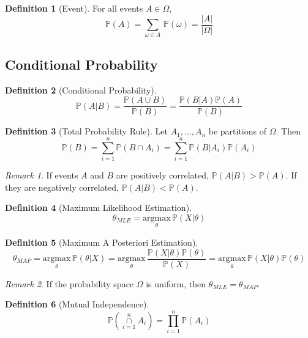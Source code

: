 \documentclass[11pt]{article}
\theoremstyle{definition}
\newtheorem{definition}{Definition}[section]
\theoremstyle{remark}
\newtheorem*{remark}{Remark}
\begin{document}
\begin{definition}[Event] For all events $A\in \Omega$,
$$\mathbb{P}(A)= \underset{\omega \in A}{\sum} \, \mathbb{P}(\omega) = \frac{|A|}{|\Omega|}$$
\end{definition}

\subsection{Conditional Probability}
\begin{definition}[Conditional Probability]
$$\mathbb{P}(A|B) = \frac{\mathbb{P}(A \cup B)}{\mathbb{P}(B)} = \frac{\mathbb{P}(B|A) \mathbb{P}(A)}{\mathbb{P}(B)}$$
\end{definition}



\begin{definition}[Total Probability Rule]
Let $A_1,\dots,A_n$ be partitions of $\Omega$. Then
\[\mathbb{P}(B)= \sum_{i=1}^n \mathbb{P}(B \cap A_i) = \sum_{i=1}^n \mathbb{P}(B|A_i) \mathbb{P}(A_i)\]
\end{definition}

\begin{remark}
If events $A$ and $B$ are positively correlated, $\mathbb{P}(A|B)>\mathbb{P}(A)$. If they are negatively correlated, $\mathbb{P}(A|B)<\mathbb{P}(A)$.
\end{remark}

\begin{definition}[Maximum Likelihood Estimation]
\[\theta_{MLE} = \underset{\theta}{\mathrm{argmax}}\, \mathbb{P}(X|\theta)\]
\end{definition}

\begin{definition}[Maximum A Posteriori Estimation]
\[\theta_{MAP} = \underset{\theta}{\mathrm{argmax}}\, \mathbb{P}(\theta|X)=\underset{\theta}{\mathrm{argmax}}\, \frac{\mathbb{P}(X|\theta)\mathbb{P}(\theta)}{\mathbb{P}(X)} = \underset{\theta}{\mathrm{argmax}}\, \mathbb{P}(X|\theta)\mathbb{P}(\theta)\]
\end{definition}

\begin{remark}
If the probability space $\Omega$ is uniform, then $\theta_{MLE} = \theta_{MAP}$.
\end{remark}

\begin{definition}[Mutual Independence]
\[\mathbb{P}\left( \overset{n}{\underset{i=1}{\cap}} A_i \right) = \prod_{i=1}^{n} \mathbb{P}(A_i) \]
\end{definition}
\end{document}
